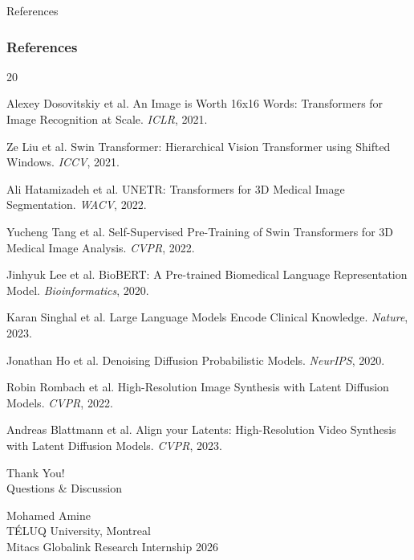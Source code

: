\documentclass[aspectratio=169]{beamer}
\begin{document}
\begin{frame}[allowframebreaks]{References}
\frametitle{References}
\begin{thebibliography}{20}
\setlength{\itemsep}{0.3em}
\footnotesize

Alexey Dosovitskiy et al.
\newblock An Image is Worth 16x16 Words: Transformers for Image Recognition at Scale.
\newblock \emph{ICLR}, 2021.

Ze Liu et al.
\newblock Swin Transformer: Hierarchical Vision Transformer using Shifted Windows.
\newblock \emph{ICCV}, 2021.

Ali Hatamizadeh et al.
\newblock UNETR: Transformers for 3D Medical Image Segmentation.
\newblock \emph{WACV}, 2022.

Yucheng Tang et al.
\newblock Self-Supervised Pre-Training of Swin Transformers for 3D Medical Image Analysis.
\newblock \emph{CVPR}, 2022.

Jinhyuk Lee et al.
\newblock BioBERT: A Pre-trained Biomedical Language Representation Model.
\newblock \emph{Bioinformatics}, 2020.

Karan Singhal et al.
\newblock Large Language Models Encode Clinical Knowledge.
\newblock \emph{Nature}, 2023.

Jonathan Ho et al.
\newblock Denoising Diffusion Probabilistic Models.
\newblock \emph{NeurIPS}, 2020.

Robin Rombach et al.
\newblock High-Resolution Image Synthesis with Latent Diffusion Models.
\newblock \emph{CVPR}, 2022.

Andreas Blattmann et al.
\newblock Align your Latents: High-Resolution Video Synthesis with Latent Diffusion Models.
\newblock \emph{CVPR}, 2023.

\end{thebibliography}
\end{frame}

\begin{frame}[standout]
    \centering
    \Huge Thank You! \\
    \vspace{1cm}
    \Large Questions \& Discussion
    
    \vspace{2cm}
    \normalsize
    Mohamed Amine \\
    TÉLUQ University, Montreal \\
    Mitacs Globalink Research Internship 2026
\end{frame}
\end{document}
